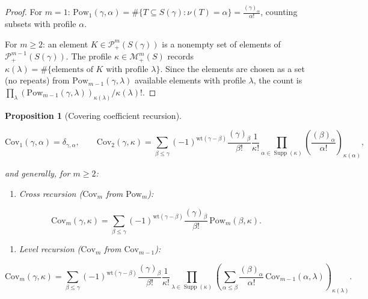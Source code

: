 \documentclass[10pt,a4paper]{article}
\theoremstyle{plain}
\newtheorem{proposition}[theorem]{Proposition}
\theoremstyle{definition}
\newcommand{\1}{\mathbb{1}} %
\newcommand{\set}[1]{\{#1\}} %
\newcommand{\KP}{\mathcal{P}}
\newcommand{\tightlist}{\setlength{\itemsep}{0pt}\setlength{\parskip}{0pt}}
\newcommand{\KM}{\mathcal{M}} %
\newcommand{\Cov}{\mathrm{Cov}} %
\DeclareMathOperator{\supp}{\mathrm{Supp}} %
\begin{document}
\begin{proof}

For \(m = 1\):
\(\mathrm{Pow}_1(\gamma, \alpha) = \#\set{T \subseteq S(\gamma) : \nu(T) = \alpha} = \frac{(\gamma)_\alpha}{\alpha!}\),
counting subsets with profile \(\alpha\).

For \(m \geq 2\): an element \(K \in \KP_+^m(S(\gamma))\) is a nonempty
set of elements of \(\KP_+^{m-1}(S(\gamma))\). The profile
\(\kappa \in \KM_+^m(S)\) records
\(\kappa(\lambda) = \#\set{\text{elements of } K \text{ with profile } \lambda}\).
Since the elements are chosen as a set (no repeats) from
\(\mathrm{Pow}_{m-1}(\gamma, \lambda)\) available elements with profile
\(\lambda\), the count is
\(\prod_\lambda (\mathrm{Pow}_{m-1}(\gamma, \lambda))_{\kappa(\lambda)} / \kappa(\lambda)!\).

\end{proof}

\begin{proposition}[Covering coefficient recursion]

\label{prop:covering-recursion}

\[
  \Cov_1(\gamma, \alpha) = \delta_{\gamma, \alpha}, \qquad \Cov_2(\gamma, \kappa) = \sum_{\beta \leq \gamma} (-1)^{\mathrm{wt}(\gamma - \beta)} \frac{(\gamma)_\beta}{\beta!} \frac{1}{\kappa!} \prod_{\alpha \in \supp(\kappa)} \left(\frac{(\beta)_\alpha}{\alpha!}\right)_{\kappa(\alpha)},
\]

and generally, for \(m \geq 2\):

\begin{enumerate}
\def\labelenumi{\arabic{enumi})}
\tightlist
\item
  \emph{Cross recursion} (\(\Cov_m\) from \(\mathrm{Pow}_m\)):
\end{enumerate}

\[
  \Cov_m(\gamma, \kappa) = \sum_{\beta \leq \gamma} (-1)^{\mathrm{wt}(\gamma - \beta)} \frac{(\gamma)_\beta}{\beta!}\, \mathrm{Pow}_m(\beta, \kappa).
\]

\begin{enumerate}
\def\labelenumi{\arabic{enumi})}
\setcounter{enumi}{1}
\tightlist
\item
  \emph{Level recursion} (\(\Cov_m\) from \(\Cov_{m-1}\)):
\end{enumerate}

\[
  \Cov_m(\gamma, \kappa) = \sum_{\beta \leq \gamma} (-1)^{\mathrm{wt}(\gamma - \beta)} \frac{(\gamma)_\beta}{\beta!} \frac{1}{\kappa!} \prod_{\lambda \in \supp(\kappa)} \left(\sum_{\alpha \leq \beta} \frac{(\beta)_\alpha}{\alpha!}\, \Cov_{m-1}(\alpha, \lambda)\right)_{\!\kappa(\lambda)}.
\]

\end{proposition}
\end{document}
